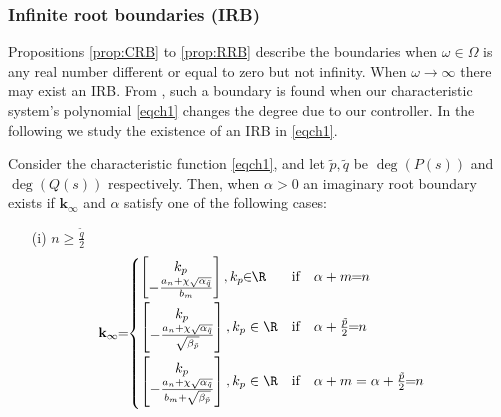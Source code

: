 \documentclass[twoside,reqno,11pt]{fcaa-var} %
\begin{document}
\subsubsection{Infinite root boundaries (IRB)}
Propositions \ref{prop:CRB} to \ref{prop:RRB} describe the boundaries when $\omega\in\Omega$ is any real number different or equal to zero but not infinity. When $\omega\rightarrow\infty$ there may exist an IRB. From \cite{gryazina2008d}, such a boundary is found when our characteristic system's polynomial \eqref{eqch1} changes the degree due to our controller. In the following we study the existence of an IRB in \eqref{eqch1}.
\begin{proposition} \label{prop:IRB}
	Consider the characteristic function \eqref{eqch1}, and let
	$\tilde{p},\tilde{q}$ be $\deg(P(s))$ and $\deg(Q(s))$ respectively. Then, when $\alpha>0$ an imaginary root boundary exists if $\mathbf{k}_\infty$ and $\alpha$ satisfy one of the following cases:
	\begin{itemize}
		\item[(i)] $n\geq\frac{\tilde{q}}{2}$ 
		\begin{equation}
		\!\!\!\!\!\!\!\!\mathbf{k}_\infty\!\!=\!\!\begin{cases} \begin{bmatrix} k_p \\ -\tfrac{a_n+\chi\sqrt{\alpha_{\tilde{q}}}}{b_m} \end{bmatrix} \vspace{1mm}, k_p\!\!\in\!\!\R & \text{if}\quad \alpha+m\!\!=\!\!n \\ \vspace{1mm}
		\begin{bmatrix} k_p \\ -\tfrac{a_n+\chi\sqrt{\alpha_{\tilde{q}}}}{\sqrt{\beta_{\tilde{p}}}} \end{bmatrix}, k_p\in\R & \text{if}\quad \alpha+\tfrac{\tilde{p}}{2}\!\!=\!\!n \\ \vspace{1mm}
		\begin{bmatrix} k_p \\ -\tfrac{a_n+\chi\sqrt{\alpha_{\tilde{q}}}}{b_m+\sqrt{\beta_{\tilde{p}}}} \end{bmatrix}, k_p\in\R & \text{if}\quad \alpha+m=\alpha+\tfrac{\tilde{p}}{2}\!\!=\!\!n

\end{cases}
\end{equation}
\end{itemize}
\end{proposition}
\end{document}
